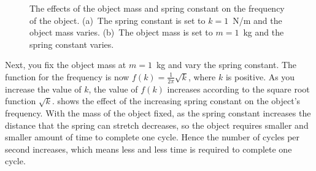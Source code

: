 \documentclass[a4paper,oneside,12pt]{article}
\begin{document}
\begin{problem}
{\begin{solution}
\begin{figure}[!htbp]
\centering
{}
\caption{%
  The effects of the object mass and spring constant on the frequency
  of the object.  (a)~The spring constant is set to $k = 1$~N/m and
  the object mass varies.  (b)~The object mass is set to $m = 1$~kg
  and the spring constant varies.
}
\label{fig:trigonometric:spring_frequency}
\end{figure}

Next, you fix the object mass at $m = 1$~kg and vary the spring
constant.  The function for the frequency is now
$f(k) = \frac{1}{2\pi} \sqrt{k}$, where $k$ is positive.  As you
increase the value of $k$, the value of $f(k)$ increases according to
the square root function $\sqrt{k}$.
 shows
the effect of the increasing spring constant on the object's
frequency.  With the mass of the object fixed, as the spring constant
increases the distance that the spring can stretch decreases, so the
object requires smaller and smaller amount of time to complete one
cycle.  Hence the number of cycles per second increases, which means
less and less time is required to complete one cycle.


\end{solution}}
\end{problem}
\end{document}
